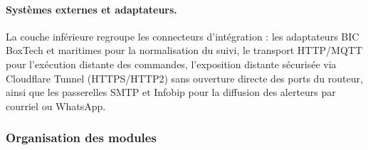 \paragraph{Systèmes externes et adaptateurs.}
La couche inférieure regroupe les connecteurs d'intégration : les adaptateurs BIC BoxTech et maritimes pour la normalisation du suivi, le transport HTTP/MQTT pour l'exécution distante des commandes, l'exposition distante sécurisée via Cloudflare Tunnel (HTTPS/HTTP2) sans ouverture directe des ports du routeur, ainsi que les passerelles SMTP et Infobip pour la diffusion des alerteurs par courriel ou WhatsApp.

\subsubsection{Organisation des modules}

